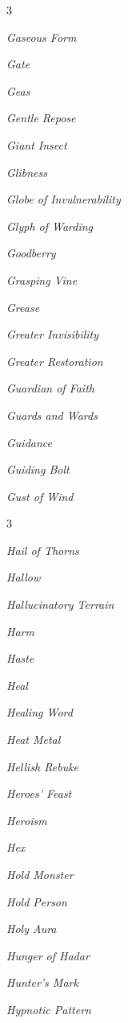 \documentclass[10pt,a4paper,twoside,bg=print,twocolumn,openany,nodeprecatedcode]{dndbook}
\begin{document}
\begin{description}
\begin{multicols}{3}
\item \textit{Gaseous Form}
\item \textit{Gate}
\item \textit{Geas}
\item \textit{Gentle Repose}
\item \textit{Giant Insect}
\item \textit{Glibness}
\item \textit{Globe of Invulnerability}
\item \textit{Glyph of Warding}
\item \textit{Goodberry}
\item \textit{Grasping Vine}
\item \textit{Grease}
\item \textit{Greater Invisibility}
\item \textit{Greater Restoration}
\item \textit{Guardian of Faith}
\item \textit{Guards and Wards}
\item \textit{Guidance}
\item \textit{Guiding Bolt}
\item \textit{Gust of Wind}
\end{multicols}

\end{description}


\begin{description}
\begin{multicols}{3}
\item \textit{Hail of Thorns}
\item \textit{Hallow}
\item \textit{Hallucinatory Terrain}
\item \textit{Harm}
\item \textit{Haste}
\item \textit{Heal}
\item \textit{Healing Word}
\item \textit{Heat Metal}
\item \textit{Hellish Rebuke}
\item \textit{Heroes' Feast}
\item \textit{Heroism}
\item \textit{Hex}
\item \textit{Hold Monster}
\item \textit{Hold Person}
\item \textit{Holy Aura}
\item \textit{Hunger of Hadar}
\item \textit{Hunter's Mark}
\item \textit{Hypnotic Pattern}
\end{multicols}

\end{description}
\end{document}
